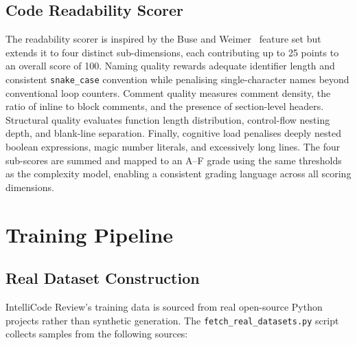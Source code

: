 \documentclass[12pt, oneside]{report}
\begin{document}
\subsection{Code Readability Scorer}
\label{ssec:readability}

The readability scorer is inspired by the Buse and Weimer~\cite{buse2010} feature
set but extends it to four distinct sub-dimensions, each contributing up to 25 points
to an overall score of 100. Naming quality rewards adequate identifier length and
consistent \texttt{snake\_case} convention while penalising single-character names
beyond conventional loop counters. Comment quality measures comment density,
the ratio of inline to block comments, and the presence of section-level headers.
Structural quality evaluates function length distribution, control-flow nesting depth,
and blank-line separation. Finally, cognitive load penalises deeply nested boolean
expressions, magic number literals, and excessively long lines. The four sub-scores
are summed and mapped to an A--F grade using the same thresholds as the complexity
model, enabling a consistent grading language across all scoring dimensions.

\section{Training Pipeline}
\label{sec:training}

\subsection{Real Dataset Construction}

IntelliCode Review's training data is sourced from real open-source Python projects rather
than synthetic generation. The \texttt{fetch\_real\_datasets.py} script collects samples
from the following sources:
\end{document}
